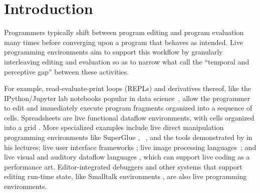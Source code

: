 \vspace{-5px}
\newcommand{\introSec}{Introduction}
\section{\protect\introSec} %
\label{sec:intro}


Programmers typically shift between program editing and program evaluation many times before converging upon a program that behaves as intended. 
Live programming environments aim to support this workflow by granularly interleaving editing and evaluation so as to   
narrow what \citet{burckhardt2013s} call the ``temporal and perceptive gap'' between these activities.

For example, read-evaluate-print loops (REPLs) and derivatives thereof, like the IPython/Jupyter lab notebooks popular in data science~\cite{PER-GRA:2007}, allow the programmer to edit and immediately execute program fragments organized into a sequence of cells. 
Spreadsheets are live functional dataflow environments, with cells organized into a grid \cite{DBLP:journals/jfp/Wakeling07}. 
More specialized examples include live direct manipulation programming environments like SuperGlue
\cite{McDirmid:2007}, \sns{}~\cite{sns-pldi,sns-uist}, and the tools
demonstrated by \citet{victor2012inventing} in his lectures;
%
live user interface frameworks \cite{burckhardt2013s};
%
live image processing languages~\cite{DBLP:journals/vlc/Tanimoto90};
%
and live visual and auditory dataflow languages \cite{DBLP:conf/vl/BurnettAW98}, which can support live coding as a performance art.
Editor-integrated debuggers \cite{mccauley2008debugging} and other systems that support editing run-time state, like Smalltalk environments \cite{Goldberg:1983cn}, are also live programming environments. 

